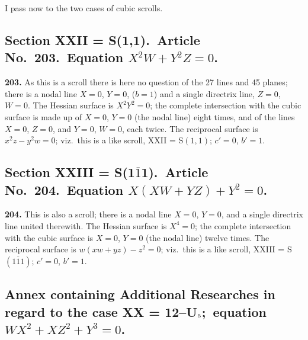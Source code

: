 \documentclass[11pt,a4paper]{article}
\theoremstyle{definition}
\begin{document}
I pass now to the two cases of cubic scrolls.

\subsection*{Section XXII = S(1,1).\ Article No.\ 203.\ Equation $X^2W+Y^2Z=0$.}

\noindent\textbf{203.} As this is a scroll there is here no question of the 27 lines and 45 planes; there is a nodal line $X=0$, $Y=0$, ($b=1$) and a single directrix line, $Z=0$, $W=0$. The Hessian surface is $X^2Y^2=0$; the complete intersection with the cubic surface is made up of $X=0$, $Y=0$ (the nodal line) eight times, and of the lines $X=0$, $Z=0$, and $Y=0$, $W=0$, each twice. The reciprocal surface is $x^2z-y^2w=0$; viz.\ this is a like scroll, XXII = S$(1,1)$; $c'=0$, $b'=1$.

\subsection*{Section XXIII = S(1$\overline{1}$1).\ Article No.\ 204.\ Equation $X(XW+YZ)+Y^2=0$.}

\noindent\textbf{204.} This is also a scroll; there is a nodal line $X=0$, $Y=0$, and a single directrix line united therewith. The Hessian surface is $X^4=0$; the complete intersection with the cubic surface is $X=0$, $Y=0$ (the nodal line) twelve times. The reciprocal surface is $w(xw+yz)-z^2=0$; viz.\ this is a like scroll, XXIII = S$(1\overline{1}1)$; $c'=0$, $b'=1$.


\subsection*{Annex containing Additional Researches in regard to the case XX = 12--U$_{\mbox{\scriptsize 5}}$;\ equation $WX^2+XZ^2+Y^3=0$.}
\end{document}
